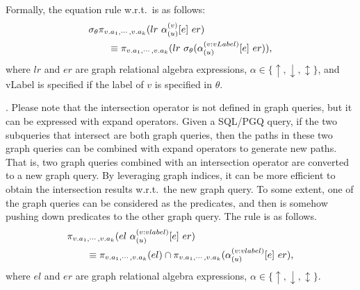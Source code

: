 Formally, the equation rule w.r.t.~\filterrule is as follows:
\begin{equation}
    \begin{split}
    & \sigma_{\theta}\pi_{v.a_1, \cdots, v.a_k}(lr~\alpha_{(u)}^{(v)}[e]~er) \\
    & \hspace*{2em} \equiv \pi_{v.a_1, \cdots, v.a_k}(lr~\sigma_{\theta}(\alpha_{(u)}^{(v:vLabel)}[e]~er)), \\
    \end{split}
\end{equation}
where $lr$ and $er$ are graph relational algebra expressions, $\alpha \in \{\uparrow, \downarrow, \updownarrow\}$, and vLabel is specified if the label of $v$ is specified in $\theta$.


\intersectrule. 
Please note that the intersection operator is not defined in graph queries, but it can be expressed with expand operators.
Given a SQL/PGQ query, if the two subqueries that intersect are both graph queries, then the paths in these two graph queries can be combined with expand operators to generate new paths.
That is, two graph queries combined with an intersection operator are converted to a new graph query.
By leveraging graph indices, it can be more efficient to obtain the intersection results w.r.t.~the new graph query.
To some extent, one of the graph queries can be considered as the predicates, and then \intersectrule is somehow pushing down predicates to the other graph query.
The rule is as follows.
\begin{equation}
    \begin{split}
        & \pi_{v.a_1, \cdots, v.a_k}(el~\alpha_{(u)}^{(v:vlabel)}[e]~er) \\
        & \hspace*{2em} \equiv \pi_{v.a_1, \cdots, v.a_k}(el) \cap \pi_{v.a_1, \cdots, v.a_k}(\alpha_{(u)}^{(v:vlabel)}[e]~er),
    \end{split}
\end{equation}
where $el$ and $er$ are graph relational algebra expressions, $\alpha \in \{\uparrow, \downarrow, \updownarrow\}$.

